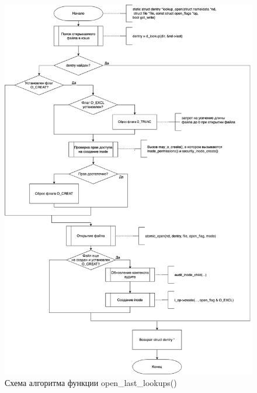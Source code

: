 \begin{figure}[H]
	\centering
	\includegraphics[scale=0.4]{assets/lookup_open.png}
	\caption{Схема алгоритма функции open\_last\_lookups()}
\end{figure}

